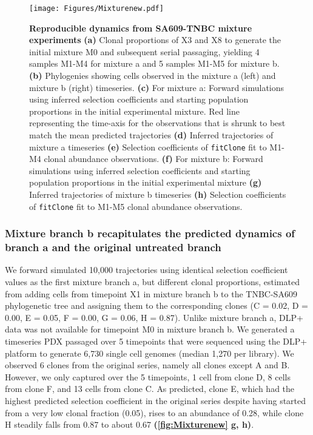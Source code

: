 \begin{figure}
\centering
\texttt{[image: Figures/Mixturenew.pdf]}
	
\caption[Reproducible dynamics from SA609-TNBC mixture experiments]
	{\small
	\textbf{Reproducible dynamics from SA609-TNBC mixture experiments}
	    \textbf{(a)} Clonal proportions of X3 and X8 to generate the initial mixture M0 and subsequent serial passaging, yielding 4 samples M1-M4 for mixture a and 5 samples
M1-M5 for mixture b.
	    \textbf{(b)} Phylogenies showing cells observed in the mixture a (left) and mixture b (right) timeseries.
	     \textbf{(c)} For mixture a: Forward simulations using inferred selection coefficients and starting population proportions in the initial experimental mixture. Red line representing the time-axis for the observations that is shrunk to best match the mean predicted trajectories
	     \textbf{(d)} Inferred trajectories of mixture a timeseries \textbf{(e)} Selection coefficients of \texttt{fitClone} fit to M1-M4 clonal abundance observations.
 \textbf{(f)} For mixture b: Forward simulations using inferred selection coefficients and starting population proportions in the initial experimental mixture
  \textbf{(g)} Inferred trajectories of mixture b timeseries
	  \textbf{(h)} Selection coefficients of \texttt{fitClone} fit to
M1-M5 clonal abundance observations.    
}
	\label{fig:Mixturenew}
\end{figure}



\subsubsection{Mixture branch b recapitulates the predicted dynamics of branch a and the original untreated branch}
We forward simulated 10,000 trajectories using identical selection coefficient values as the first mixture branch a, but different clonal proportions, estimated from adding cells from timepoint X1 in mixture branch b to the TNBC-SA609 phylogenetic tree and assigning them to the corresponding clones (C = 0.02, D = 0.00, E = 0.05, F = 0.00, G = 0.06, H = 0.87). Unlike mixture branch a, DLP+ data was not available for timepoint M0 in mixture branch b. We generated a timeseries PDX passaged over 5 timepoints that were sequenced using the DLP+ platform to generate 6,730 single cell genomes (median 1,270 per library). We observed 6 clones from the original series, namely all clones except A and B. However, we only captured over the 5 timepoints, 1 cell from clone D, 8 cells from clone F, and 13 cells from clone C. As predicted, clone E, which had the highest predicted selection coefficient in the original series despite having started from a very low clonal fraction (0.05), rises to an abundance of 0.28, while clone H steadily falls from 0.87 to about 0.67 \textbf{(\autoref{fig:Mixturenew} g, h)}.

